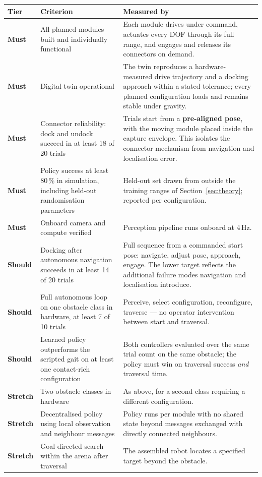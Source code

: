 \documentclass[11pt,a4paper]{article}
\newif\ifreview
\newenvironment{pblock}{\ifreview\color{blue}\fi}{}
\begin{document}
\begin{pblock}
\begin{longtable}{@{}L{0.09\textwidth} L{0.40\textwidth} L{0.44\textwidth}@{}}
\toprule
\textbf{Tier} & \textbf{Criterion} & \textbf{Measured by} \\
\midrule
\endhead
\textbf{Must} & All planned modules built and individually functional &
  Each module drives under command, actuates every DOF through its full range,
  and engages and releases its connectors on demand. \\
\textbf{Must} & Digital twin operational &
  The twin reproduces a hardware-measured drive trajectory and a docking
  approach within a stated tolerance; every planned configuration loads and
  remains stable under gravity. \\
\textbf{Must} & Connector reliability: dock and undock succeed in at least
  18 of 20 trials &
  Trials start from a \textbf{pre-aligned pose}, with the moving module placed
  inside the capture envelope. This isolates the connector mechanism from
  navigation and localisation error. \\
\textbf{Must} & Policy success at least 80\,\% in simulation, including
  held-out randomisation parameters &
  Held-out set drawn from outside the training ranges of
  Section~\ref{sec:theory}; reported per configuration. \\
\textbf{Must} & Onboard camera and compute verified &
  Perception pipeline runs onboard at 4\,Hz. \\
\textbf{Should} & Docking after autonomous navigation succeeds in at least
  14 of 20 trials &
  Full sequence from a commanded start pose: navigate, adjust pose, approach,
  engage. The lower target reflects the additional failure modes navigation and
  localisation introduce. \\
\textbf{Should} & Full autonomous loop on one obstacle class in hardware, at
  least 7 of 10 trials &
  Perceive, select configuration, reconfigure, traverse --- no operator
  intervention between start and traversal. \\
\textbf{Should} & Learned policy outperforms the scripted gait on at least one
  contact-rich configuration &
  Both controllers evaluated over the same trial count on the same obstacle;
  the policy must win on traversal success \textit{and} traversal time. \\
\textbf{Stretch} & Two obstacle classes in hardware &
  As above, for a second class requiring a different configuration. \\
\textbf{Stretch} & Decentralised policy using local observation and neighbour
  messages &
  Policy runs per module with no shared state beyond messages exchanged with
  directly connected neighbours. \\
\textbf{Stretch} & Goal-directed search within the arena after traversal &
  The assembled robot locates a specified target beyond the obstacle. \\
\bottomrule
\end{longtable}
\end{pblock}
\end{document}
